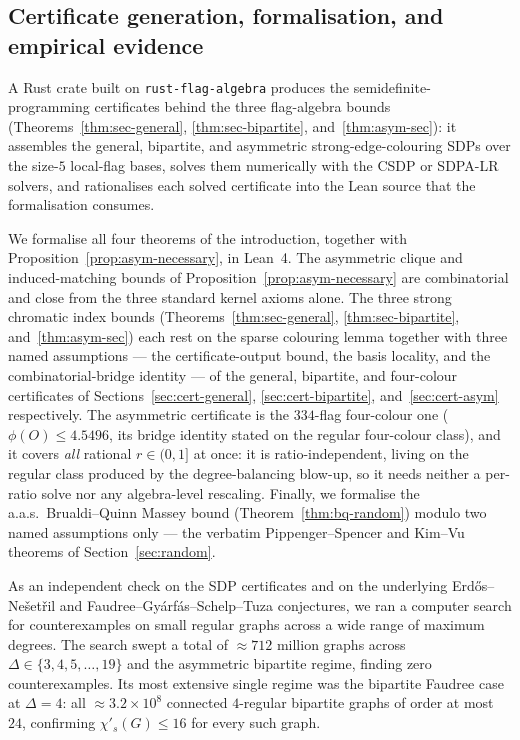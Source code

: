 \documentclass[11pt,a4paper]{article}
\theoremstyle{definition}
\theoremstyle{remark}
\begin{document}
\subsection*{Certificate generation, formalisation, and empirical evidence}
\label{sec:lean-and-empirical}


A Rust crate built on \texttt{rust-flag-algebra} produces the
semidefinite-programming certificates behind the three flag-algebra
bounds (Theorems~\ref{thm:sec-general}, \ref{thm:sec-bipartite},
and~\ref{thm:asym-sec}): it assembles the general, bipartite, and
asymmetric strong-edge-colouring SDPs over the size-$5$ local-flag
bases, solves them numerically with the CSDP or SDPA-LR solvers, and
rationalises each solved certificate into the Lean source that the
formalisation consumes.

We formalise all four theorems of the introduction, together with
Proposition~\ref{prop:asym-necessary}, in Lean~4. The
asymmetric clique and induced-matching bounds of
Proposition~\ref{prop:asym-necessary} are combinatorial and close from
the three standard kernel axioms alone.
The three strong chromatic index bounds
(Theorems~\ref{thm:sec-general}, \ref{thm:sec-bipartite},
and~\ref{thm:asym-sec}) each rest on the sparse colouring lemma
together with three named assumptions --- the certificate-output bound,
the basis locality, and the combinatorial-bridge identity --- of the
general, bipartite, and four-colour certificates of
Sections~\ref{sec:cert-general}, \ref{sec:cert-bipartite},
and~\ref{sec:cert-asym} respectively. The asymmetric certificate is the
$334$-flag four-colour one ($\phi(O) \leq 4.5496$, its bridge identity
stated on the regular four-colour class), and it covers \emph{all}
rational $r \in (0, 1]$ at once: it is ratio-independent, living on the
regular class produced by the degree-balancing blow-up, so it needs
neither a per-ratio solve nor any algebra-level rescaling. Finally, we
formalise the a.a.s.~Brualdi--Quinn Massey bound
(Theorem~\ref{thm:bq-random}) modulo two named assumptions only --- the
verbatim Pippenger--Spencer and Kim--Vu theorems of
Section~\ref{sec:random}.

As an independent check on the SDP certificates and on the
underlying Erd\H{o}s--Ne\v{s}et\v{r}il and
Faudree--Gy\'arf\'as--Schelp--Tuza conjectures, we ran a
computer search for counterexamples on small regular graphs across
a wide range of maximum degrees. The search swept a total of
$\approx 712$ million graphs across $\Delta \in \{3, 4, 5, \dots, 19\}$
and the asymmetric bipartite regime, finding zero counterexamples. Its
most extensive single regime was the bipartite Faudree case at
$\Delta = 4$: all $\approx 3.2 \times 10^{8}$ connected $4$-regular
bipartite graphs of order at most $24$, confirming $\chi'_s(G) \leq
16$ for every such graph.
\end{document}
